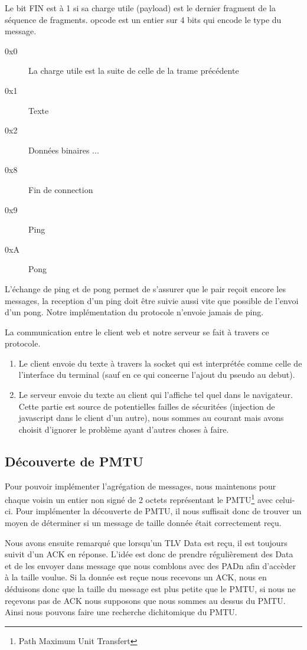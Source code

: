 \documentclass[a4paper,10pt]{article} %
\begin{document}
Le bit \textrm{FIN} est à 1 si sa charge utile (payload) est le dernier fragment de la séquence de fragments. \textrm{opcode} est un entier sur 4 bits qui encode le type du message.

\begin{description}
\item[0x0] La charge utile est la suite de celle de la trame précédente
\item[0x1] Texte
\item[0x2] Données binaires
  ...
\item[0x8] Fin de connection
\item[0x9] Ping
\item[0xA] Pong
\end{description}

L'échange de ping et de pong permet de s'assurer que le pair reçoit encore les messages, la reception d'un ping doit être suivie aussi vite que possible de l'envoi d'un pong. Notre implémentation du protocole n'envoie jamais de ping.

La communication entre le client web et notre serveur se fait à travers ce protocole.
\begin{enumerate}
\item Le client envoie du texte à travers la socket qui est interprétée comme celle de l'interface du terminal (sauf en ce qui concerne l'ajout du pseudo au debut).
\item Le serveur envoie du texte au client qui l'affiche tel quel dans le navigateur. Cette partie est source de potentielles failles de sécuritées (injection de javascript dans le client d'un autre), nous sommes au courant mais avons choisit d'ignorer le problème ayant d'autres choses à faire.
\end{enumerate}

\subsection{Découverte de PMTU\label{sec:pmtu}}

Pour pouvoir implémenter l'agrégation de messages, nous maintenons pour chaque voisin un entier non signé de 2 octets représentant le \textrm{PMTU}\footnote{Path Maximum Unit Transfert} avec celui-ci. Pour implémenter la découverte de \textrm{PMTU}, il nous suffisait donc de trouver un moyen de déterminer si un message de taille donnée était correctement reçu.

Nous avons ensuite remarqué que lorsqu'un TLV Data est reçu, il est toujours suivit d'un ACK en réponse. L'idée est donc de prendre régulièrement des Data et de les envoyer dans message que nous comblons avec des PADn afin d'accèder à la taille voulue. Si la donnée est reçue nous recevons un ACK, nous en déduisons donc que la taille du message est plus petite que le \textrm{PMTU}, si nous ne reçevons pas de ACK nous supposons que nous sommes au dessus du \textrm{PMTU}. Ainsi nous pouvons faire une recherche dichitomique du PMTU.
\end{document}
